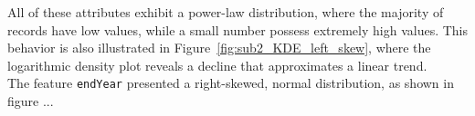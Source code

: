 All of these attributes exhibit a power-law distribution, where the majority of records have low values, while a small number possess extremely high values. This behavior is also illustrated in Figure~\ref{fig:sub2_KDE_left_skew}, where the logarithmic density plot reveals a decline that approximates a linear trend.\\




The feature \texttt{endYear} presented a right-skewed, normal distribution, as shown in figure ...








